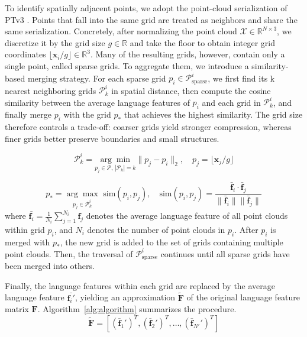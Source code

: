 \documentclass[10pt,twocolumn,letterpaper]{article}
\begin{document}
To identify spatially adjacent points, we adopt the point-cloud serialization of PTv3 \cite{wu2024ptv3,wu2022ptv2,wu2024ppt,pointcept2023}. Points that fall into the same grid are treated as neighbors and share the same serialization. Concretely, after normalizing the point cloud $\mathcal{X} \in \mathbb{R}^{N \times 3}$, we discretize it by the grid size $g \in \mathbb{R}$ and take the floor to obtain integer grid coordinates $\lfloor \mathbf{x}_i/g \rfloor \in \mathbb{R}^{3}$.
Many of the resulting grids, however, contain only a single point, called sparse grids. To aggregate them, we introduce a similarity-based merging strategy. For each sparse grid $p_i \in \mathcal{P}_\text{sparse}^i$, we first find its k nearest neighboring grids $\mathcal{P}_k^i$ in spatial distance, then compute the cosine similarity between the average language features of $p_i$ and each grid in $\mathcal{P}_k^i$, and finally merge $p_i$ with the grid $p_*$ that achieves the highest similarity. The grid size therefore controls a trade-off: coarser grids yield stronger compression, whereas finer grids better preserve boundaries and small structures.

\begin{equation}
    \mathcal{P}_k^i = \underset{p_j \in \mathcal{P},\, |\mathcal{P}_k|=k}{\arg\min} \|p_j - p_i\|_2, \quad p_j = \lfloor \mathbf{x}_j/g \rfloor
\end{equation}

\begin{equation}
    p_* = \underset{p_j \in \mathcal{P}_k^i} {\arg\max} \text{ sim}(p_i, p_j), \quad\text{sim}(p_i, p_j) = \frac{\bar{\mathbf{f}}_i \cdot \bar{\mathbf{f}}_j}{\|\bar{\mathbf{f}}_i\| \|\bar{\mathbf{f}}_j\|}
\end{equation}
where $\bar{\mathbf{f}_i} = \frac{1}{N_i} \sum_{j=1}^{N_i} \mathbf{f}_j$ denotes the average language feature of all point clouds within grid $p_i$, and $N_i$ denotes the number of point clouds in $p_i$. 
After $p_i$ is merged with $p_*$, the new grid is added to the set of grids containing multiple point clouds. Then, the traversal of $\mathcal{P}_\text{sparse}^i$ continues until all sparse grids have been merged into others. 

Finally, the language features within each grid are replaced by the average language feature $\bar{\mathbf{f}_i'}$, yielding an approximation $\tilde{\mathbf{F}}$ of the original language feature matrix $\mathbf{F}$. Algorithm~\ref{alg:algorithm} summarizes the procedure.
\begin{equation}
    \tilde{\mathbf{F}} = [(\bar{\mathbf{f}}_1')^T, (\bar{\mathbf{f}}_2')^T, \dots, (\bar{\mathbf{f}}_{N'}')^T]
\end{equation}
\end{document}
